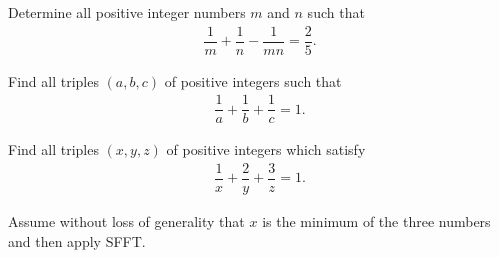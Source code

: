 \documentclass{subfile}
\begin{document}

	\begin{problem} %
		Determine all positive integer numbers $m$ and $n$ such that
			\begin{align*}
				\dfrac{1}{m}+\dfrac{1}{n}-\dfrac{1}{mn}=\dfrac{2}{5}.
			\end{align*}
	\end{problem}

	\begin{problem} %
		Find all triples $(a,b,c)$ of positive integers such that
			\begin{align*}
				\dfrac{1}{a}+\dfrac{1}{b}+\dfrac{1}{c}=1.
			\end{align*}
	\end{problem}

	\begin{problem} %
		Find all triples $(x,y,z)$ of positive integers which satisfy
			\begin{align*}
				\dfrac{1}{x}+\dfrac{2}{y}+\dfrac{3}{z}=1.
			\end{align*}
	\end{problem}

	\begin{hint}
		Assume without loss of generality that $x$ is the minimum of the three numbers and then apply SFFT.
	\end{hint}
\end{document}

